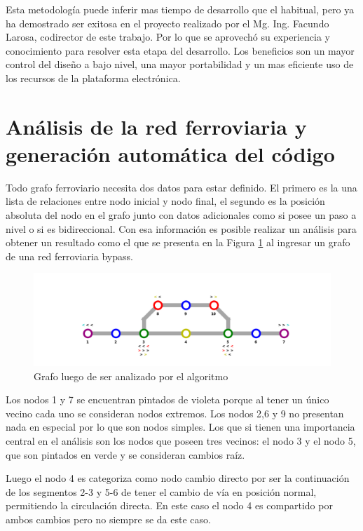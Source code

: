 	Esta metodología puede inferir mas tiempo de desarrollo que el habitual, pero ya ha demostrado ser exitosa en el proyecto realizado por el Mg. Ing. Facundo Larosa, codirector de este trabajo. Por lo que se aprovechó su experiencia y conocimiento para resolver esta etapa del desarrollo. Los beneficios son un mayor control del diseño a bajo nivel, una mayor portabilidad y un mas eficiente uso de los recursos de la plataforma electrónica.

\section{Análisis de la red ferroviaria y generación automática del código}

	Todo grafo ferroviario necesita dos datos para estar definido. El primero es la una lista de relaciones entre nodo inicial y nodo final, el segundo es la posición absoluta del nodo en el grafo junto con datos adicionales como si posee un paso a nivel o si es bidireccional. Con esa información es posible realizar un análisis para obtener un resultado como el que se presenta en la Figura \ref{fig:Mapa} al ingresar un grafo de una red ferroviaria bypass.	

	\begin{figure}[h]
	\centering
		\includegraphics[scale=.4]{./Figures/Mapa_2}
		\caption{Grafo luego de ser analizado por el algoritmo}
		\label{fig:Mapa}
	\end{figure}

	Los nodos 1 y 7 se encuentran pintados de violeta porque al tener un único vecino cada uno se consideran nodos extremos. Los nodos 2,6 y 9 no presentan nada en especial por lo que son nodos simples. Los que si tienen una importancia central en el análisis son los nodos que poseen tres vecinos: el nodo 3 y el nodo 5, que son pintados en verde y se consideran cambios raíz.

	Luego el nodo 4 es categoriza como nodo cambio directo por ser la continuación de los segmentos 2-3 y 5-6 de tener el cambio de vía en posición normal, permitiendo la circulación directa. En este caso el nodo 4 es compartido por ambos cambios pero no siempre se da este caso.
	
